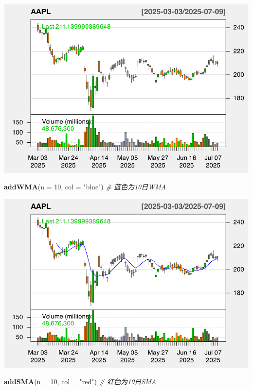 \documentclass[]{ctexbook}
\newenvironment{Shaded}{\begin{snugshade}}{\end{snugshade}}
\newcommand{\AttributeTok}[1]{\textcolor[rgb]{0.13,0.29,0.53}{#1}}
\newcommand{\CommentTok}[1]{\textcolor[rgb]{0.56,0.35,0.01}{\textit{#1}}}
\newcommand{\DecValTok}[1]{\textcolor[rgb]{0.00,0.00,0.81}{#1}}
\newcommand{\FunctionTok}[1]{\textcolor[rgb]{0.13,0.29,0.53}{\textbf{#1}}}
\newcommand{\NormalTok}[1]{#1}
\newcommand{\StringTok}[1]{\textcolor[rgb]{0.31,0.60,0.02}{#1}}
\begin{document}
\includegraphics[width=0.9\linewidth]{quantmod_files/figure-latex/wma-1}

\begin{Shaded}
\begin{Highlighting}[]
\FunctionTok{addWMA}\NormalTok{(}\AttributeTok{n =} \DecValTok{10}\NormalTok{, }\AttributeTok{col =} \StringTok{"blue"}\NormalTok{)    }\CommentTok{\# 蓝色为10日WMA}
\end{Highlighting}
\end{Shaded}

\includegraphics[width=0.9\linewidth]{quantmod_files/figure-latex/wma-2}

\begin{Shaded}
\begin{Highlighting}[]
\FunctionTok{addSMA}\NormalTok{(}\AttributeTok{n =} \DecValTok{10}\NormalTok{, }\AttributeTok{col =} \StringTok{"red"}\NormalTok{)     }\CommentTok{\# 红色为10日SMA}
\end{Highlighting}
\end{Shaded}
\end{document}
